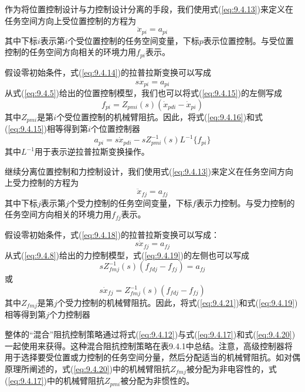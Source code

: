 \documentclass[12pt,a4paper]{ctexart}
\begin{document}
作为将位置控制设计与力控制设计分离的手段，我们使用式(\ref{eq:9.4.13})来定义在任务空间方向上受位置控制的方程为
\begin{equation}\label{eq:9.4.14}
\ddot{x}_{pi} = a_{pi}
\end{equation}
其中下标$i$表示第$i$个受位置控制的任务空间变量，下标$p$表示位置控制。与受位置控制的任务空间方向相关的环境力用$f_{pi}$表示。

假设零初始条件，式(\ref{eq:9.4.14})的拉普拉斯变换可以写成
\begin{equation}\label{eq:9.4.15}
s\dot{x}_{pi} = a_{pi}
\end{equation}
从式(\ref{eq:9.4.5})给出的位置控制模型，我们也可以将式(\ref{eq:9.4.15})的左侧写成
\begin{equation}\label{eq:9.4.16}
f_{pi} = Z_{pmi}(s)(\dot{x}_{pdi} - \dot{x}_{pi})
\end{equation}
其中$Z_{pmi}$是第$i$个受位置控制的机械臂阻抗。因此，将式(\ref{eq:9.4.16})和式(\ref{eq:9.4.15})相等得到第$i$个位置控制器
\begin{equation}\label{eq:9.4.17}
a_{pi} = s\dot{x}_{pdi} - sZ_{pmi}^{-1}(s)L^{-1}\{f_{pi}\}
\end{equation}
其中$L^{-1}$用于表示逆拉普拉斯变换操作。

继续分离位置控制和力控制设计，我们使用式(\ref{eq:9.4.13})来定义在任务空间方向上受力控制的方程为
\begin{equation}\label{eq:9.4.18}
\ddot{x}_{fj} = a_{fj}
\end{equation}
其中下标$j$表示第$j$个受力控制的任务空间变量，下标$f$表示力控制。与受力控制的任务空间方向相关的环境力用$f_{fj}$表示。

假设零初始条件，式(\ref{eq:9.4.18})的拉普拉斯变换可以写成：
\begin{equation}\label{eq:9.4.19}
s\dot{x}_{fj} = a_{fj}
\end{equation}
从式(\ref{eq:9.4.8})给出的力控制模型，式(\ref{eq:9.4.19})的左侧也可以写成
\begin{equation}\label{eq:9.4.20}
sZ_{fmj}^{-1}(s)(f_{fdj} - f_{fj}) = a_{fj}
\end{equation}
或
\begin{equation}\label{eq:9.4.21}
s\dot{x}_{fj} = Z_{fmj}^{-1}(s)(f_{fdj} - f_{fj})
\end{equation}
其中$Z_{fmj}$是第$j$个受力控制的机械臂阻抗。因此，将式(\ref{eq:9.4.21})和式(\ref{eq:9.4.19})相等得到第$j$个力控制器

整体的``混合''阻抗控制策略通过将式(\ref{eq:9.4.12})与式(\ref{eq:9.4.17})和式(\ref{eq:9.4.20})一起使用来获得。这种混合阻抗控制策略在表9.4.1中总结。注意，高级控制器将用于选择要受位置或力控制的任务空间分量，然后分配适当的机械臂阻抗。如对偶原理所阐述的，式(\ref{eq:9.4.20})中的机械臂阻抗$Z_{fmj}$被分配为非电容性的，式(\ref{eq:9.4.17})中的机械臂阻抗$Z_{pmi}$被分配为非惯性的。
\end{document}
